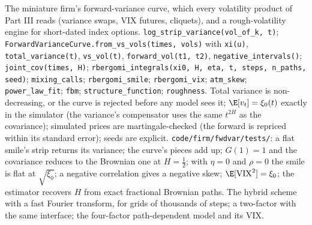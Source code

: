 \begin{build}
 The miniature firm's forward-variance curve, which every volatility product of Part III reads
(variance swaps, VIX futures, cliquets), and a rough-volatility engine for short-dated index options.
 \texttt{log\_strip\_variance(vol\_of\_k, t)}; \texttt{ForwardVarianceCurve}\allowbreak\texttt{.from\_vs\_vols(times, vols)} with \texttt{xi(u)}, \texttt{total\_variance(t)}, \texttt{vs\_vol(t)}, \texttt{forward\_vol(t1, t2)},
\texttt{negative\_intervals()}; \texttt{joint\_cov(times, H)}; \texttt{rbergomi\_integrals(xi0, H, eta, t,
steps, n\_paths, seed)}; \texttt{mixing\_calls}; \texttt{rbergomi\_smile}; \texttt{rbergomi\_vix}; \texttt{atm\_skew};
\texttt{power\_law\_fit}; \texttt{fbm}; \texttt{structure\_function}; \texttt{roughness}.
 Total variance is non-decreasing, or the curve is rejected before any model sees it;
$\E[v_t]=\xi_0(t)$ exactly in the simulator (the variance's compensator uses the same $t^{2H}$ as the
covariance); simulated prices are martingale-checked (the forward is repriced within its standard error);
seeds are explicit.
 \texttt{code/firm/fwdvar/tests/}: a flat smile's strip returns its variance; the curve's
pieces add up; $G(1)=1$ and the covariance reduces to the Brownian one at $H=\frac12$; with $\eta=0$ and
$\rho=0$ the smile is flat at $\sqrt{\xi_0}$; a negative correlation gives a negative skew;
$\E[\mathrm{VIX}^2]=\xi_0$; the estimator recovers $H$ from exact fractional Brownian paths.
 The hybrid scheme with a fast Fourier transform, for grids of thousands of steps; a two-factor
 with the same interface; the four-factor path-dependent model and its VIX.
\end{build}

